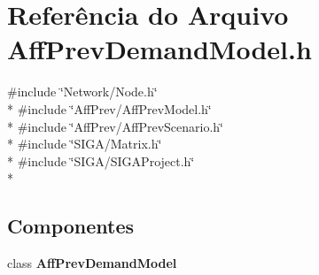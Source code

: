 \section{Referência do Arquivo Aff\+Prev\+Demand\+Model.\+h}
\label{_aff_prev_demand_model_8h}
{\ttfamily \#include \char`\"{}Network/\+Node.\+h\char`\"{}}\\*
{\ttfamily \#include \char`\"{}Aff\+Prev/\+Aff\+Prev\+Model.\+h\char`\"{}}\\*
{\ttfamily \#include \char`\"{}Aff\+Prev/\+Aff\+Prev\+Scenario.\+h\char`\"{}}\\*
{\ttfamily \#include \char`\"{}S\+I\+G\+A/\+Matrix.\+h\char`\"{}}\\*
{\ttfamily \#include \char`\"{}S\+I\+G\+A/\+S\+I\+G\+A\+Project.\+h\char`\"{}}\\*
\subsection*{Componentes}
\begin{DoxyCompactItemize}
\item 
class {\bf Aff\+Prev\+Demand\+Model}
\end{DoxyCompactItemize}
